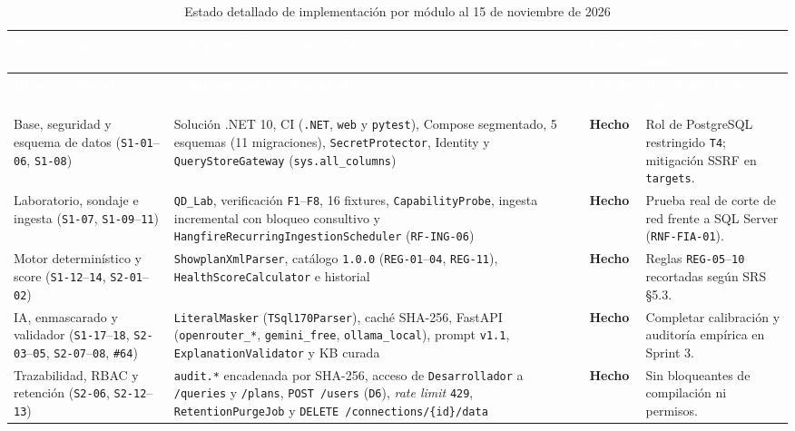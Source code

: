 \documentclass[12pt,a4paper]{article}
\begin{document}
\begingroup
{}
\scriptsize
\begin{longtable}{p{} p{} p{} p{}}
\toprule
\rowcolor{utbblue}
\textcolor{white}{\textbf{Bloque / Sprint}} & \textcolor{white}{\textbf{Componentes implementados}} & \textcolor{white}{\textbf{Estado}} & \textcolor{white}{\textbf{Pendiente técnico real}} \\
\midrule
\endfirsthead
\toprule
\rowcolor{utbblue}
\textcolor{white}{\textbf{Bloque / Sprint}} & \textcolor{white}{\textbf{Componentes implementados}} & \textcolor{white}{\textbf{Estado}} & \textcolor{white}{\textbf{Pendiente técnico real}} \\
\midrule
\endhead
\bottomrule
\caption{Estado detallado de implementación por módulo al 15 de noviembre de 2026}
\label{tab:estado-impl}
\endlastfoot
Base, seguridad y esquema de datos (\texttt{S1-01}--\texttt{06}, \texttt{S1-08}) & Solución .NET 10, CI (\texttt{.NET}, \texttt{web} y \texttt{pytest}), Compose segmentado, 5 esquemas (11 migraciones), \texttt{SecretProtector}, Identity y \texttt{QueryStoreGateway} (\texttt{sys.all\_columns}) & \textbf{Hecho} & Rol de PostgreSQL restringido \texttt{T4}; mitigación SSRF en \texttt{targets}. \\
Laboratorio, sondaje e ingesta (\texttt{S1-07}, \texttt{S1-09}--\texttt{11}) & \texttt{QD\_Lab}, verificación \texttt{F1}--\texttt{F8}, 16 fixtures, \texttt{CapabilityProbe}, ingesta incremental con bloqueo consultivo y \texttt{HangfireRecurringIngestionScheduler} (\texttt{RF-ING-06}) & \textbf{Hecho} & Prueba real de corte de red frente a SQL Server (\texttt{RNF-FIA-01}). \\
Motor determinístico y score (\texttt{S1-12}--\texttt{14}, \texttt{S2-01}--\texttt{02}) & \texttt{ShowplanXmlParser}, catálogo \texttt{1.0.0} (\texttt{REG-01}--\texttt{04}, \texttt{REG-11}), \texttt{HealthScoreCalculator} e historial & \textbf{Hecho} & Reglas \texttt{REG-05}--\texttt{10} recortadas según SRS §5.3. \\
IA, enmascarado y validador (\texttt{S1-17}--\texttt{18}, \texttt{S2-03}--\texttt{05}, \texttt{S2-07}--\texttt{08}, \texttt{\#64}) & \texttt{LiteralMasker} (\texttt{TSql170Parser}), caché SHA-256, FastAPI (\texttt{openrouter\_*}, \texttt{gemini\_free}, \texttt{ollama\_local}), prompt \texttt{v1.1}, \texttt{ExplanationValidator} y KB curada & \textbf{Hecho} & Completar calibración y auditoría empírica en Sprint 3. \\
Trazabilidad, RBAC y retención (\texttt{S2-06}, \texttt{S2-12}--\texttt{13}) & \texttt{audit.*} encadenada por SHA-256, acceso de \texttt{Desarrollador} a \texttt{/queries} y \texttt{/plans}, \texttt{POST /users} (\texttt{D6}), \textit{rate limit} \texttt{429}, \texttt{RetentionPurgeJob} y \texttt{DELETE /connections/\{id\}/data} & \textbf{Hecho} & Sin bloqueantes de compilación ni permisos. \\

\end{longtable}
\end{document}

